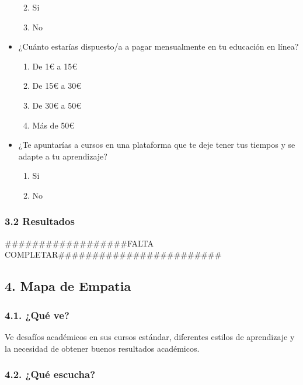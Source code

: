 \documentclass[
]{article}
\providecommand{\tightlist}{%
  \setlength{\itemsep}{0pt}\setlength{\parskip}{0pt}}
\begin{document}
\begin{itemize}
  \begin{enumerate}
  \def\labelenumi{\alph{enumi}.}
  \tightlist
  \item
    Si
  \item
    No
  \end{enumerate}
\item
  ¿Cuánto estarías dispuesto/a a pagar mensualmente en tu educación en
  línea?

  \begin{enumerate}
  \def\labelenumi{\alph{enumi}.}
  \tightlist
  \item
    De 1€ a 15€
  \item
    De 15€ a 30€
  \item
    De 30€ a 50€
  \item
    Más de 50€
  \end{enumerate}
\item
  ¿Te apuntarías a cursos en una plataforma que te deje tener tus
  tiempos y se adapte a tu aprendizaje?

  \begin{enumerate}
  \def\labelenumi{\alph{enumi}.}
  \tightlist
  \item
    Si
  \item
    No
  \end{enumerate}
\end{itemize}

\subsubsection{3.2 Resultados}\label{resultados}

\#\#\#\#\#\#\#\#\#\#\#\#\#\#\#\#\#\#FALTA
COMPLETAR\#\#\#\#\#\#\#\#\#\#\#\#\#\#\#\#\#\#\#\#\#\#\#\#

\newpage

\subsection{4. Mapa de Empatia}\label{mapa-de-empatia}

\subsubsection{4.1. ¿Qué ve?}\label{quuxe9-ve}

Ve desafíos académicos en sus cursos estándar, diferentes estilos de
aprendizaje y la necesidad de obtener buenos resultados académicos.

\subsubsection{4.2. ¿Qué escucha?}\label{quuxe9-escucha}
\end{document}
